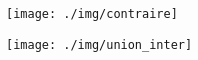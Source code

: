 \documentclass[12pt,a4paper]{article}
\date{}
\title{}
\begin{document}


%


\begin{multicols}{2}
	\begin{center}
		
		\texttt{[image: ./img/contraire]}
		\label{fig:contraire}
		
		
		\texttt{[image: ./img/union\_inter]}
		\label{fig:union}
	\end{center}
	
	
\end{multicols}	

%


%		
%		
%		
%	
%	









	
\end{document}
